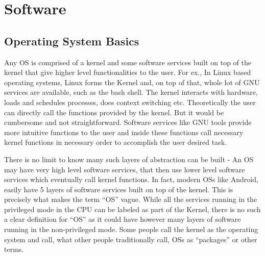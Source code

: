 \part{Software}
\chapter{Operating System Basics}
Any OS is comprised of a kernel and some software services built on top of the kernel that give higher level functionalities to the user. For ex., In Linux based operating systems, Linux forms the Kernel and, on top of that, whole lot of GNU services are available, such as the bash shell. The kernel interacts with hardware, loads and schedules processes, does context switching etc. Theoretically the user can directly call the functions provided by the kernel. But it would be cumbersome and not straightforward. Software services like GNU tools provide more intuitive functions to the user and inside these functions call necessary kernel functions in necessary order to accomplish the user desired task. 

There is no limit to know many such layers of abstraction can be built - An OS may have very high level software services, that then use lower level software services which eventually call kernel functions. In fact, modern OSs like Android, easily have 5 layers of software services built on top of the kernel. This is precisely what makes the term ``OS'' vague. While all the services running in the privileged mode in the CPU can be labeled as part of the Kernel, there is no such a clear definition for ``OS'' as it could have however many layers of software running in the non-privileged mode. Some people call the kernel as the operating system and call, what other people traditionally call, OSs as ``packages'' or other terms. 

